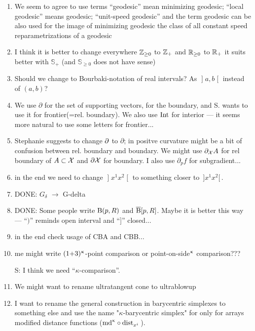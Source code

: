 \begin{enumerate}
\item We seem to agree to use terms
``geodesic'' mean minimizing geodesic;
``local geodesic'' means geodesic;
``unit-speed geodesic'' and the term geodesic can be also used for
 the image of minimizing geodesic
the class of all constant speed reparametrizations of a geodesic 

\item I think it is better to change everywhere $\ZZ_{\ge0}$ to $\mathbb{Z}_+$ and $\RR_{\ge0}$ to $\mathbb{R}_+$ it suits better with $\mathbb{S}_+$ (and $\mathbb{S}_{\ge0}$ does not have sense)

\item Should we change to Bourbaki-notation of real intervals? As $\mathopen{]}a,b\mathclose{[}$ instead of $(a,b)$?

\item We use $\partial$ for the set of supporting vectors, for the boundary, and S. wants to use it for frontier(=rel. boundary). We also use $\mathop{\rm Int}\nolimits$ for interior --- it seems more natural to use some letters for frontier...

\item Stephanie suggests to change $\partial$ to $\partial$; in positve curvature might be  a bit of confusion between rel. boundary and boundary. We might use $\partial_{\mathcal{X}}A$ for rel boundary of $A\subset \spc{X}$ and $\partial\mathcal{X}$ for boundary. I also use $\partial_p f$ for subgradient...

\item in the end we need to change $\mathopen{]}x^1x^2\mathclose{[}$ to something closer to 
$\,{]}x^1x^2{[}\,$.

\item DONE: $G_\delta$ $\to$ G-delta

\item DONE: Some people write $\mathrm{B}{}(p,R)$ and $\overline{\mathrm{B}}{}[p,R]$. 
Maybe it is better this way --- ``$)$'' reminds open interval and ``$]$'' closed...

\item in the end check usage of CBA and CBB...

\item me might write $(1{+}3)^{\upkappa}$-point comparison or point-on-side${}^{\upkappa}$ comparison???

S: I think we need   ``$\kappa$-comparison''.

\item We might want to rename ultratangent cone to ultrablowup

\item I want to rename the general construction 
in barycentric simplexes to something else
and use the name "$\kappa$-barycentric simplex"
for only for arrays modified distance functions
($\md\kappa\circ\distfun{x^i}{}{}$).


\end{enumerate}
